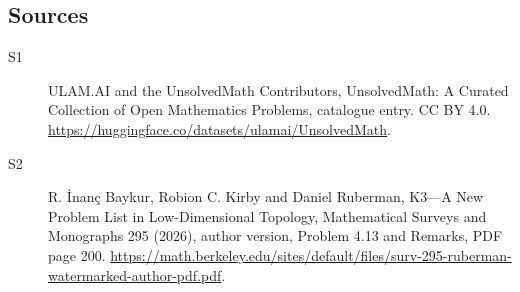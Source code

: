 \documentclass[11pt]{article}
\begin{document}
\subsection{Sources}
\begin{description}
\item[\hypertarget{source:statement:1}{S1}] ULAM.AI and the UnsolvedMath Contributors, UnsolvedMath: A Curated Collection of Open Mathematics Problems, catalogue entry. CC BY 4.0. \url{https://huggingface.co/datasets/ulamai/UnsolvedMath}.
\item[\hypertarget{source:statement:2}{S2}] R. İnanç Baykur, Robion C. Kirby and Daniel Ruberman, K3—A New Problem List in Low-Dimensional Topology, Mathematical Surveys and Monographs 295 (2026), author version, Problem 4.13 and Remarks, PDF page 200. \url{https://math.berkeley.edu/sites/default/files/surv-295-ruberman-watermarked-author-pdf.pdf}.
\end{description}
\label{end:statement}
\end{document}
